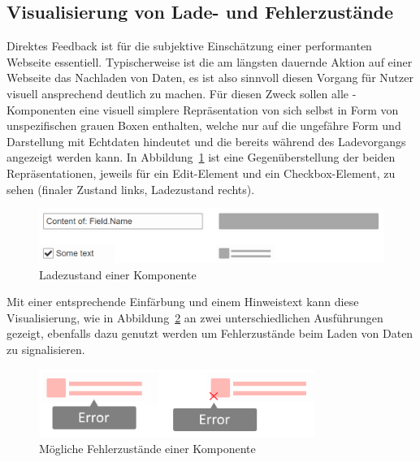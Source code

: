 \subsection{Visualisierung von Lade- und Fehlerzustände}\label{subsec:loading_state_section}
Direktes Feedback ist für die subjektive Einschätzung einer performanten Webseite essentiell. Typischerweise ist die am längsten dauernde Aktion auf einer Webseite das Nachladen von Daten, es ist also sinnvoll diesen Vorgang für Nutzer visuell ansprechend deutlich zu machen. Für diesen Zweck sollen alle -Komponenten eine visuell simplere Repräsentation von sich selbst in Form von unspezifischen grauen Boxen enthalten, welche nur auf die ungefähre Form und Darstellung mit Echtdaten hindeutet und die bereits während des Ladevorgangs angezeigt werden kann. In Abbildung~\ref{fig:comp_loading_final_comparison} ist eine Gegenüberstellung der beiden Repräsentationen, jeweils für ein Edit-Element und ein Checkbox-Element, zu sehen (finaler Zustand links, Ladezustand rechts).

\begin{figure}
    \centering
    \captionsetup{justification=centering}
    \includegraphics[width=\textwidth]{figures/comp_loading_final_comparison.png}
        \caption{Ladezustand einer Komponente}\label{fig:comp_loading_final_comparison}
\end{figure}

Mit einer entsprechende Einfärbung und einem Hinweistext kann diese Visualisierung, wie in Abbildung~\ref{fig:comp_possible_error_state} an zwei unterschiedlichen Ausführungen gezeigt, ebenfalls dazu genutzt werden um Fehlerzustände beim Laden von Daten zu signalisieren.

\begin{figure}
    \centering
    \captionsetup{justification=centering}
    \includegraphics[width=0.8\textwidth]{figures/comp_possible_error_state.png}
        \caption{Mögliche Fehlerzustände einer Komponente}\label{fig:comp_possible_error_state}
\end{figure}

